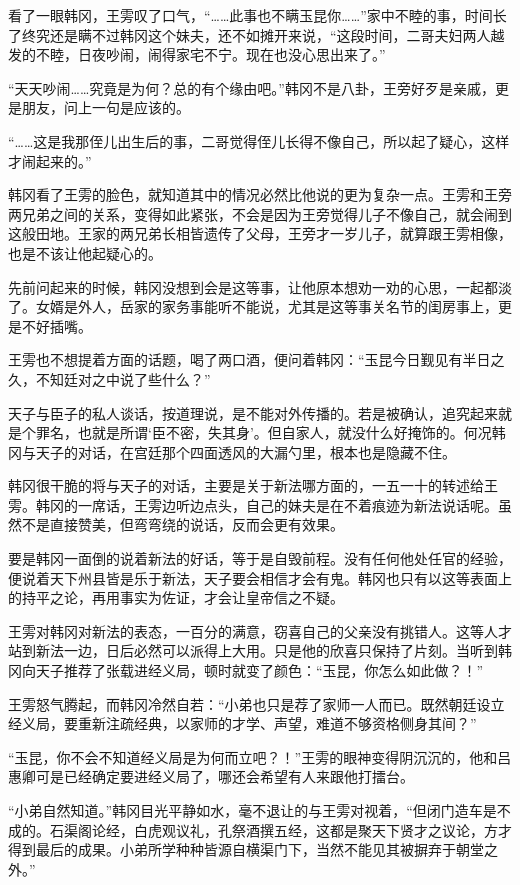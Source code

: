 看了一眼韩冈，王雱叹了口气，“……此事也不瞒玉昆你……”家中不睦的事，时间长了终究还是瞒不过韩冈这个妹夫，还不如摊开来说，“这段时间，二哥夫妇两人越发的不睦，日夜吵闹，闹得家宅不宁。现在也没心思出来了。”

“天天吵闹……究竟是为何？总的有个缘由吧。”韩冈不是八卦，王旁好歹是亲戚，更是朋友，问上一句是应该的。

“……这是我那侄儿出生后的事，二哥觉得侄儿长得不像自己，所以起了疑心，这样才闹起来的。”

韩冈看了王雱的脸色，就知道其中的情况必然比他说的更为复杂一点。王雱和王旁两兄弟之间的关系，变得如此紧张，不会是因为王旁觉得儿子不像自己，就会闹到这般田地。王家的两兄弟长相皆遗传了父母，王旁才一岁儿子，就算跟王雱相像，也是不该让他起疑心的。

先前问起来的时候，韩冈没想到会是这等事，让他原本想劝一劝的心思，一起都淡了。女婿是外人，岳家的家务事能听不能说，尤其是这等事关名节的闺房事上，更是不好插嘴。

王雱也不想提着方面的话题，喝了两口酒，便问着韩冈：“玉昆今日觐见有半日之久，不知廷对之中说了些什么？”

天子与臣子的私人谈话，按道理说，是不能对外传播的。若是被确认，追究起来就是个罪名，也就是所谓‘臣不密，失其身’。但自家人，就没什么好掩饰的。何况韩冈与天子的对话，在宫廷那个四面透风的大漏勺里，根本也是隐藏不住。

韩冈很干脆的将与天子的对话，主要是关于新法哪方面的，一五一十的转述给王雱。韩冈的一席话，王雱边听边点头，自己的妹夫是在不着痕迹为新法说话呢。虽然不是直接赞美，但弯弯绕的说话，反而会更有效果。

要是韩冈一面倒的说着新法的好话，等于是自毁前程。没有任何他处任官的经验，便说着天下州县皆是乐于新法，天子要会相信才会有鬼。韩冈也只有以这等表面上的持平之论，再用事实为佐证，才会让皇帝信之不疑。

王雱对韩冈对新法的表态，一百分的满意，窃喜自己的父亲没有挑错人。这等人才站到新法一边，日后必然可以派得上大用。只是他的欣喜只保持了片刻。当听到韩冈向天子推荐了张载进经义局，顿时就变了颜色：“玉昆，你怎么如此做？！”

王雱怒气腾起，而韩冈冷然自若：“小弟也只是荐了家师一人而已。既然朝廷设立经义局，要重新注疏经典，以家师的才学、声望，难道不够资格侧身其间？”

“玉昆，你不会不知道经义局是为何而立吧？！”王雱的眼神变得阴沉沉的，他和吕惠卿可是已经确定要进经义局了，哪还会希望有人来跟他打擂台。

“小弟自然知道。”韩冈目光平静如水，毫不退让的与王雱对视着，“但闭门造车是不成的。石渠阁论经，白虎观议礼，孔祭酒撰五经，这都是聚天下贤才之议论，方才得到最后的成果。小弟所学种种皆源自横渠门下，当然不能见其被摒弃于朝堂之外。”

